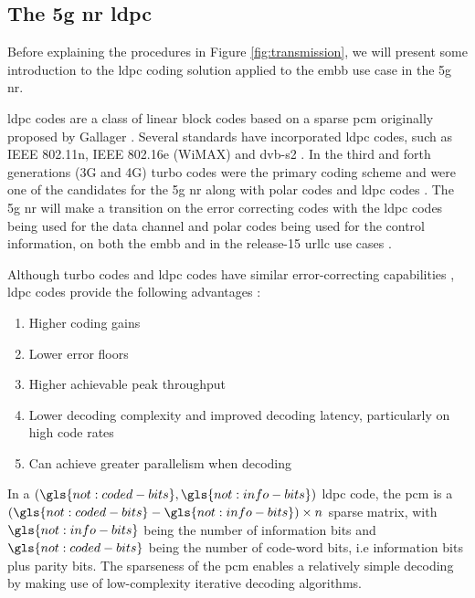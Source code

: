 

\subsection{The \gls{5g} \gls{nr} \gls{ldpc}}


Before explaining the procedures in Figure \ref{fig:transmission}, we will present some introduction to the \gls{ldpc} coding solution applied to the \gls{embb} use case in the \gls{5g} \gls{nr}.
%

\Gls{ldpc} codes are a class of linear block codes based on a sparse \gls{pcm}  originally proposed by Gallager \cite{gallager1962}.
%
Several standards have incorporated \gls{ldpc} codes, such as IEEE 802.11n, IEEE 802.16e (WiMAX) and \gls{dvb-s2} \cite{AliZaidi632018}.
%
In the third and forth generations (3G and 4G) turbo codes were the primary coding scheme \cite{Richardson2018} and were one of the candidates for the \gls{5g} \gls{nr} along with polar codes and \gls{ldpc} codes \cite{Hamidi8417496}.
%
The \gls{5g} \gls{nr} will make a transition on the error correcting codes with the \gls{ldpc} codes being used for the data channel and polar codes being used for the control information, on both the \gls{embb} and in the release-15 \gls{urllc} use cases \cite{bae_abotabl_lin_song_lee_2019}.

Although turbo codes and \gls{ldpc} codes have similar error-correcting capabilities \cite{ErikDahlman5G}, \gls{ldpc} codes provide the following advantages \cite{Hui2018}:

\begin{enumerate}
    \item Higher coding gains
    \item Lower error floors
    \item Higher achievable peak throughput
    \item Lower decoding complexity and improved decoding latency, particularly on high code rates
    \item Can achieve greater parallelism when decoding
\end{enumerate}

In a $(\gls{not:coded-bits}, \gls{not:info-bits})$ \gls{ldpc} code, the \gls{pcm} is a $ (\gls{not:coded-bits}-\gls{not:info-bits}) \times n$ sparse matrix, with $\gls{not:info-bits}$ being the number of information bits and $\gls{not:coded-bits}$ being the number of code-word bits, i.e information bits plus parity bits.
%
The sparseness of the \gls{pcm} enables a relatively simple decoding by making use of low-complexity iterative decoding algorithms.



